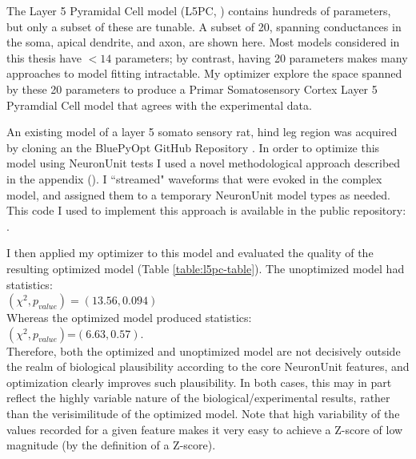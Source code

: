 \begin{table}
\caption[Subset of model parameters in the conductance-based L5PC neuron]{The Layer 5 Pyramidal Cell model (L5PC, \citep{van2016bluepyopt}
) contains hundreds of parameters, but only a subset of these are tunable.
A subset of 20, spanning conductances in the soma, apical dendrite, and axon, are shown here.
Most models considered in this thesis have $<14$ parameters; by contrast, having 20 parameters makes many approaches to model fitting intractable.
My optimizer explore the space spanned by these 20 parameters to produce a Primar Somatosensory Cortex Layer 5 Pyramdial Cell model that agrees with the experimental data.}
\label{fig:ca1_parameters}
\end{table}



An existing model of a layer 5 somato sensory rat, hind leg region was acquired by cloning an the BluePyOpt GitHub Repository \citep{van2016bluepyopt}.
In order to optimize this model using NeuronUnit tests I used a novel methodological approach described in the appendix (\label{sec:streaming}). I ``streamed" waveforms that were evoked in the complex model, and assigned them to a temporary  NeuronUnit model types as needed. This code I used to implement this approach is available in the public repository: \citep{l5pcnu}. 

I then applied my optimizer to this model and evaluated the quality of the resulting optimized model (Table \ref{table:l5pc-table}).
The unoptimized model had statistics:\\
$(\chi^{2},p_{value})=(13.56, 0.094)$\\
Whereas the optimized model produced statistics:\\
$(\chi^{2},p_{value})$=$(6.63, 0.57)$.\\
Therefore, both the optimized and unoptimized model are not decisively outside the realm of biological plausibility according to the core NeuronUnit features, and optimization clearly improves such plausibility.
In both cases, this may in part reflect the highly variable nature of the biological/experimental results, rather than the verisimilitude of the optimized model.
Note that high variability of the values recorded for a given feature makes it very easy to achieve a Z-score of low magnitude (by the definition of a Z-score).


